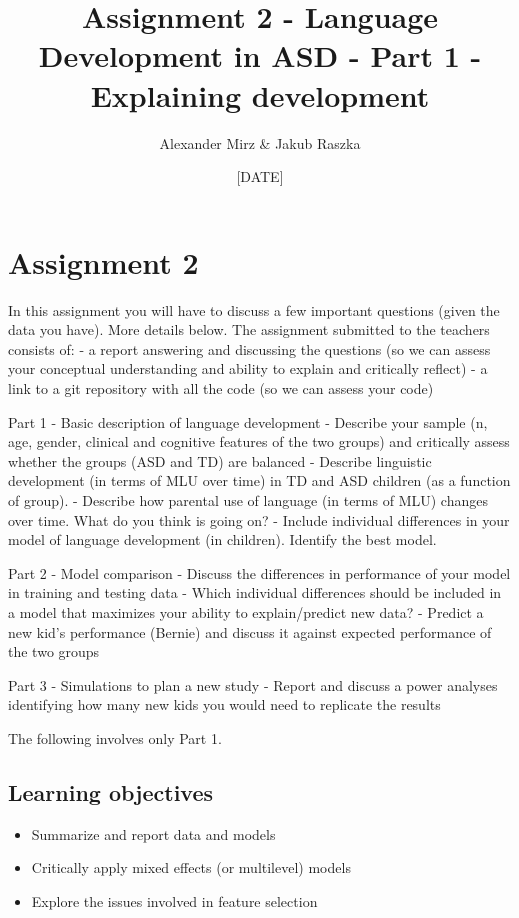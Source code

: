 \documentclass[]{article}
\title{Assignment 2 - Language Development in ASD - Part 1 - Explaining
development}
\author{Alexander Mirz \& Jakub Raszka}
\date{{[}DATE{]}}
\providecommand{\tightlist}{%
  \setlength{\itemsep}{0pt}\setlength{\parskip}{0pt}}
\begin{document}
\maketitle

\section{Assignment 2}\label{assignment-2}

In this assignment you will have to discuss a few important questions
(given the data you have). More details below. The assignment submitted
to the teachers consists of: - a report answering and discussing the
questions (so we can assess your conceptual understanding and ability to
explain and critically reflect) - a link to a git repository with all
the code (so we can assess your code)

Part 1 - Basic description of language development - Describe your
sample (n, age, gender, clinical and cognitive features of the two
groups) and critically assess whether the groups (ASD and TD) are
balanced - Describe linguistic development (in terms of MLU over time)
in TD and ASD children (as a function of group). - Describe how parental
use of language (in terms of MLU) changes over time. What do you think
is going on? - Include individual differences in your model of language
development (in children). Identify the best model.

Part 2 - Model comparison - Discuss the differences in performance of
your model in training and testing data - Which individual differences
should be included in a model that maximizes your ability to
explain/predict new data? - Predict a new kid's performance (Bernie) and
discuss it against expected performance of the two groups

Part 3 - Simulations to plan a new study - Report and discuss a power
analyses identifying how many new kids you would need to replicate the
results

The following involves only Part 1.

\subsection{Learning objectives}\label{learning-objectives}

\begin{itemize}
\tightlist
\item
  Summarize and report data and models
\item
  Critically apply mixed effects (or multilevel) models
\item
  Explore the issues involved in feature selection
\end{itemize}
\end{document}
